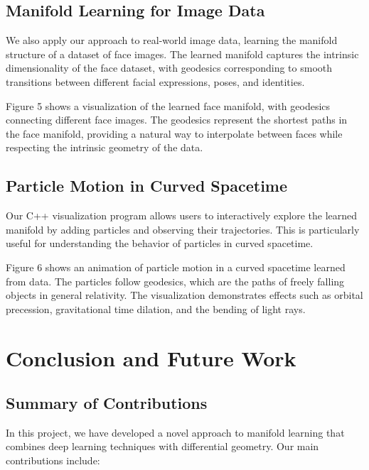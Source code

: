 \documentclass[11pt,a4paper]{article}
\begin{document}
\subsection{Manifold Learning for Image Data}

We also apply our approach to real-world image data, learning the manifold structure of a dataset of face images. The learned manifold captures the intrinsic dimensionality of the face dataset, with geodesics corresponding to smooth transitions between different facial expressions, poses, and identities.

Figure 5 shows a visualization of the learned face manifold, with geodesics connecting different face images. The geodesics represent the shortest paths in the face manifold, providing a natural way to interpolate between faces while respecting the intrinsic geometry of the data.

\subsection{Particle Motion in Curved Spacetime}

Our C++ visualization program allows users to interactively explore the learned manifold by adding particles and observing their trajectories. This is particularly useful for understanding the behavior of particles in curved spacetime.

Figure 6 shows an animation of particle motion in a curved spacetime learned from data. The particles follow geodesics, which are the paths of freely falling objects in general relativity. The visualization demonstrates effects such as orbital precession, gravitational time dilation, and the bending of light rays.

\section{Conclusion and Future Work}
\subsection{Summary of Contributions}

In this project, we have developed a novel approach to manifold learning that combines deep learning techniques with differential geometry. Our main contributions include:
\end{document}
